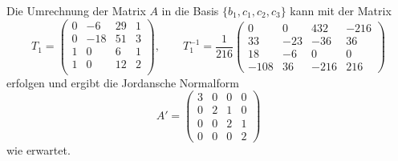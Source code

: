 \begin{loesung}
Die Umrechnung der Matrix $A$ in die Basis $\{b_1,c_1,c_2,c_3\}$ kann 
mit der Matrix
\[
T_1
=
\begin{pmatrix}
    0&  -6&  29&   1\\
    0& -18&  51&   3\\
    1&   0&   6&   1\\
    1&   0&  12&   2\\
\end{pmatrix},
\qquad
T_1^{-1}
=
\frac{1}{216}
\begin{pmatrix}
     0&    0&  432& -216\\
    33&  -23&  -36&   36\\
    18&   -6&    0&    0\\
  -108&   36& -216&  216
\end{pmatrix}
\]
erfolgen und ergibt die Jordansche Normalform
\[
A'
=
\begin{pmatrix}
3&0&0&0\\
0&2&1&0\\
0&0&2&1\\
0&0&0&2
\end{pmatrix}
\]
wie erwartet.
\end{loesung}


